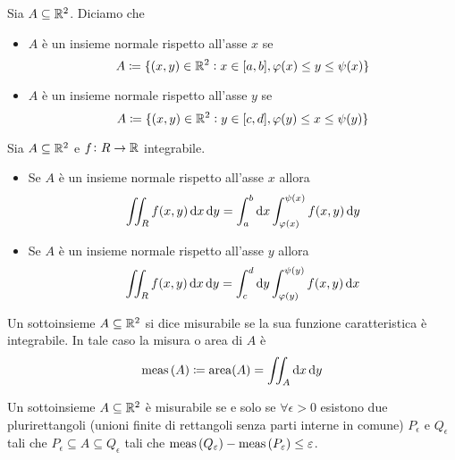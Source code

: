 \begin{definition}
	Sia $ A \subseteq \mathbb{R}^2 $. Diciamo che
	\begin{itemize}
		\item $ A $ è un insieme normale rispetto all'asse $ x $ se 
		\begin{equation}
			A \coloneqq \{(x, y) \in \mathbb{R}^2 : x \in [a, b], \varphi(x) \leq y \leq \psi(x)\}
		\end{equation}
		\item $ A $ è un insieme normale rispetto all'asse $ y $ se 
		\begin{equation}
			A \coloneqq \{(x, y) \in \mathbb{R}^2 : y \in [c, d], \varphi(y) \leq x \leq \psi(y)\}
		\end{equation}
	\end{itemize}
\end{definition}

\begin{prop}
	Sia $ A \subseteq \mathbb{R}^2 $ e $ f \colon R \to \mathbb{R} $ integrabile. 
	\begin{itemize}
		\item Se $ A $ è un insieme normale rispetto all'asse $ x $ allora
		\begin{equation}
			\iint_{R} f(x, y) \dif{x} \dif{y} = \int_{a}^{b} \dif{x} \int_{\varphi(x)}^{\psi(x)} f(x, y) \dif{y}
		\end{equation}
		
		\item Se $ A $ è un insieme normale rispetto all'asse $ y $ allora
		\begin{equation}
			\iint_{R} f(x, y) \dif{x} \dif{y} = \int_{c}^{d} \dif{y} \int_{\varphi(y)}^{\psi(y)} f(x, y) \dif{x}
		\end{equation}
	\end{itemize}
\end{prop}

\begin{definition}
	Un sottoinsieme $ A \subseteq \mathbb{R}^2 $ si dice misurabile se la sua funzione caratteristica è integrabile. In tale caso la misura o area di $ A $ è  
	\begin{equation}
		\meas{(A)} \coloneqq \mathrm{area}(A) = \iint_{A} \dif{x} \dif{y}
	\end{equation}
\end{definition}

\begin{prop}
	Un sottoinsieme $ A \subseteq \mathbb{R}^2 $ è misurabile se e solo se $ \forall \epsilon > 0 $ esistono due plurirettangoli (unioni finite di rettangoli senza parti interne in comune) $ P_{\epsilon} $ e $ Q_{\epsilon} $ tali che $ P_{\epsilon} \subseteq A \subseteq Q_{\epsilon} $ tali che $ \operatorname{meas}{(Q_\varepsilon)} - \operatorname{meas}{(P_\varepsilon)} \leq \varepsilon $. 
\end{prop}


